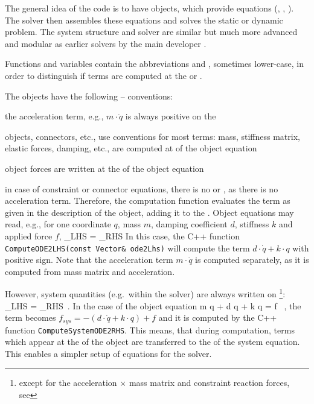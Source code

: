 \label{sec:notationSystemOfEOM}
%
The general idea of the code is to have objects, which provide equations (, , ).
The solver then assembles these equations and solves the static or dynamic problem.
The system structure and solver are similar but much more advanced and modular as earlier solvers by the main developer \cite{GerstmayrStangl2004,Gerstmayr2009,GerstmayrEtAl2013}.

 \label{eq_equationLHSRHS}
Functions and variables contain the abbreviations  and , sometimes lower-case, in order
to distinguish if terms are computed at the  or .

The objects have the following -- conventions:
\bi
		\item the acceleration term, e.g., $m \cdot \ddot q$ is always positive on the 
	  \item objects, connectors, etc., use  conventions for most terms: mass, stiffness matrix, elastic forces, damping, etc., are computed at  of the object equation
		\item object forces are written at the  of the object equation
		\item in case of constraint or connector equations, there is no  or , as there is no acceleration term. 
		Therefore, the computation function evaluates the term as given in the description of the object, adding it to the .
\ei
Object equations may read, e.g., for one coordinate $q$, mass $m$, damping coefficient $d$, stiffness $k$ and applied force $f$,
\be
  _{LHS} = _{RHS}
\ee 
In this case, the C++ function \texttt{ComputeODE2LHS(const Vector\& ode2Lhs)} will compute the term
$d \cdot \dot q + k \cdot q$ with positive sign. Note that the acceleration term $m \cdot \ddot q$ is computed separately, as it 
is computed from mass matrix and acceleration.

However, system quantities (e.g.\ within the solver) are always written on \footnote{except for the acceleration $\times$ mass matrix and constraint reaction forces, see }: 
\be 
  _{LHS} = _{RHS} \,.
\ee
In the case of the object equation
\be
  m \cdot \ddot q + d \cdot \dot q + k \cdot q = f \, ,
\ee 
the  term becomes $f_{sys} = -(d \cdot \dot q + k \cdot q) + f $ and it is computed by the C++ function \texttt{ComputeSystemODE2RHS}.
%
This means, that during computation, terms which appear at the  of the object are transferred to the  of the system equation.
This enables a simpler setup of equations for the solver.

